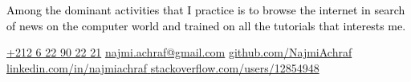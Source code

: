 \documentclass[darkpython]{../../lib/physics}
\newlength{\rightcolwidth}
\begin{document}
\begin{paracol}{2}
\begin{minipage}[t]{0.65\textwidth}
{	\parbox[b][2.2cm][c]{5cm}{
			\textcolor{black}{Among the dominant activities that I practice is to browse the internet in search of news on the computer world and trained on all the tutorials that interests me.}
		}
	}
\end{minipage}









\vfill{} %

\setlength{\parindent}{0pt}
\begin{minipage}[t]{\rightcolwidth}
\begin{center}\fontfamily{\sfdefault}\selectfont \color{black!70}
{\href{callto:+212622902221}{ \textcolor{black!70}{+212 6 22 90 22 21}} \href{mailto:najmi.achraf@gmail.com}{ \textcolor{black!70}{najmi.achraf@gmail.com}} \href{https://www.github.com/NajmiAchraf}{ \textcolor{black!70}{github.com/NajmiAchraf}} \newline\href{https://www.linkedin.com/in/najmiachraf}{ \textcolor{black!70}{linkedin.com/in/najmiachraf}}\href{https://stackoverflow.com/users/12854948}{ \textcolor{black!70}{stackoverflow.com/users/12854948}}
}
\end{center}\vspace{-2em}
\end{minipage}


\end{paracol}
\end{document}
